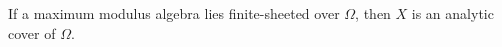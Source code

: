
If a maximum modulus algebra lies finite-sheeted over $\Omega$, then $X$ is an analytic cover of $\Omega$.

